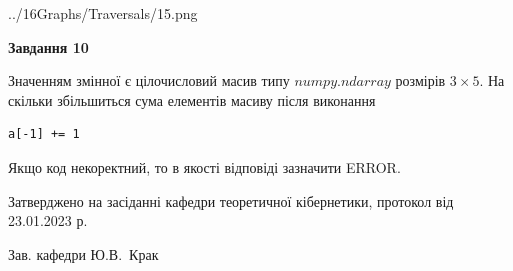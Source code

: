 \documentclass[12pt, ukrainian]{article}
\begin{document}
{\begin {large}
\begin{center}
	{../16Graphs/Traversals/15.png}
\end{center}\par
\newpage

{\begin {center}\textbf{Завдання 10}\end {center}}\par
Значенням змінної  є цілочисловий масив типу $numpy.ndarray$ розмірів $3{\times}5$. На скільки збільшиться сума елементів масиву  після виконання
\begin{verbatim}
a[-1] += 1
\end{verbatim}


Якщо код некоректний, то в якості відповіді зазначити ERROR.\par
\newpage


\end {large}
}
{\smallskip \begin {small} Затверджено на засіданні кафедри теоретичної кібернетики, протокол  від   23.01.2023 р.\par\smallskip\smallskip
{\parbox {6.5 cm}{Зав. кафедри \dotfill Ю.В.~Крак}} \end{small}}
\end{document}
